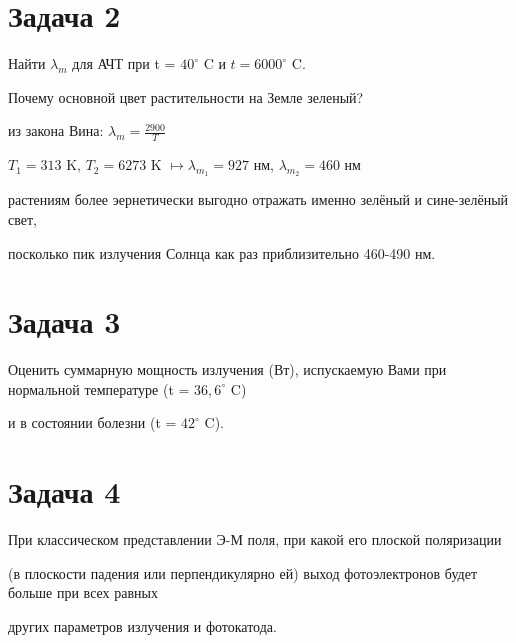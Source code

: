 \documentclass[14pt,a4paper]{article}
\begin{document}
\vspace{0.8cm}

\section*{Задача 2}
    
    \par \textsf{Найти {$\lambda_m$} для АЧТ при t = $40^{\circ}$ C и $t = 6000^{\circ}$ C.}\\ 
    \par \textsf{Почему основной цвет растительности на Земле зеленый?}\\
    
    \par из закона Вина: {$\lambda_m = \frac{2900}{T}$}\\
    
    \par {$T_1 = 313$} K, {$T_2 = 6273$} K {$\longmapsto \lambda_{m_1} = 927$} нм, {$\lambda_{m_2} = 460$} нм\\
    
    \par растениям более эернетически выгодно отражать именно зелёный и сине-зелёный свет,\\
    \par посколько пик излучения Солнца как раз приблизительно 460-490 нм.

\vspace{1cm}

\section*{Задача 3}
    
    \par \textsf{Оценить суммарную мощность излучения (Вт), испускаемую Вами при нормальной температуре (t = $36,6^{\circ}$ C)}\\
    \par \textsf{и в состоянии болезни (t = $42^{\circ}$ C).}\\

    \par
    
\section*{Задача 4}
    
    \par \textsf{При классическом представлении Э-М поля, при какой его плоской поляризации}\\
    \par \textsf{(в плоскости падения или перпендикулярно ей) выход фотоэлектронов будет больше при всех равных}\\
    \par \textsf{других параметров излучения и фотокатода.}\\
    
\end{document}
